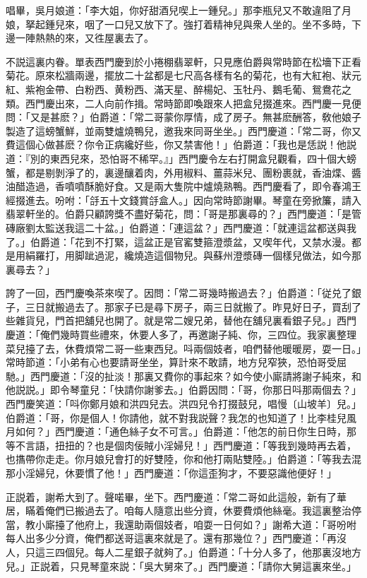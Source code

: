 唱畢，吳月娘道：「李大姐，你好甜酒兒喫上一鍾兒。」那李瓶兒又不敢違阻了月娘，拏起鍾兒來，咽了一口兒又放下了。強打着精神兒與衆人坐的。坐不多時，下邊一陣熱熱的來，又徃屋裏去了。

不説這裏内眷。單表西門慶到於小捲棚翡翠軒，只見應伯爵與常時節在松墻下正看菊花。原來松牆兩邊，擺放二十盆都是七尺高各樣有名的菊花，也有大紅袍、狀元紅、紫袍金帶、白粉西、黄粉西、滿天星、醉楊妃、玉牡丹、鵝毛葡、鴛鴦花之類。西門慶出來，二人向前作揖。常時節即喚跟來人把盒兒掇進來。西門慶一見便問：「又是甚麽？」伯爵道：「常二哥蒙你厚情，成了房子。無甚麽酬答，敎他娘子製造了這螃蟹鮮，並兩雙爐燒鴨兒，邀我來同哥坐坐。」西門慶道：「常二哥，你又費這個心做甚麽？你令正病纔好些，你又禁害他！」伯爵道：「我也是恁説！他説道：『別的東西兒來，恐怕哥不稀罕。』」西門慶令左右打開盒兒觀看，四十個大螃蟹，都是剔剝淨了的，裏邊釀着肉，外用椒料、薑蒜米兒、團粉裹就，香油煠、醬油醋造過，香噴噴酥脆好食。又是兩大隻院中爐燒熟鴨。西門慶看了，即令春鴻王經掇進去。吩咐：「㧱五十文錢賞㧱盒人。」因向常時節謝畢。琴童在旁掀簾，請入翡翠軒坐的。伯爵只顧誇獎不盡好菊花，問：「哥是那裏尋的？」西門慶道：「是管磚廠劉太監送我這二十盆。」伯爵道：「連這盆？」西門慶道：「就連這盆都送與我了。」伯爵道：「花到不打緊，這盆正是官窰雙箍澄漿盆，又喫年代，又禁水漫。都是用絹羅打，用脚跐過泥，纔燒造這個物兒。與蘇州澄漿磚一個樣兒做法，如今那裏尋去？」

誇了一回，西門慶喚茶來喫了。因問：「常二哥幾時搬過去？」伯爵道：「従兑了銀子，三日就搬過去了。那家子已是尋下房子，兩三日就搬了。昨見好日子，買刮了些雜貨兒，門首把舖兒也開了。就是常二嫂兄弟，替他在舖兒裏看銀子兒。」西門慶道：「俺們幾時買些禮來，休要人多了，再邀謝子純、你，三四位。我家裏整理菜兒擡了去，休費煩常二哥一些東西兒。呌兩個妓者，咱們替他暖暖房，耍一日。」常時節道：「小弟有心也要請哥坐坐，算計來不敢請，地方兒窄狹，恐怕哥受屈馳。」西門慶道：「沒的扯淡！那裏又費你的事起來？如今使小廝請將謝子純來，和他説説。」即令琴童兒：「快請你謝爹去。」伯爵因問：「哥，你那日呌那兩個去？」西門慶笑道：「呌你鄭月娘和洪四兒去。洪四兒令打掇鼓兒，唱慢〔山坡羊〕兒。」伯爵道：「哥，你是個人！你請他，就不對我説聲？我怎的也知道了！比李桂兒風月如何？」西門慶道：「通色絲子女不可言。」伯爵道：「他怎的前日你生日時，那等不言語，扭扭的？也是個肉佞賊小淫婦兒！」西門慶道：「等我到幾時再去着，也㩦帶你走走。你月娘兒會打的好雙陸，你和他打兩貼雙陸。」伯爵道：「等我去混那小淫婦兒，休要慣了他！」西門慶道：「你這歪狗才，不要惡識他便好！」

正説着，謝希大到了。聲喏畢，坐下。西門慶道：「常二哥如此這般，新有了華居，瞞着俺們已搬過去了。咱每人隨意出些分資，休要費煩他絲毫。我這裏整治停當，教小廝擡了他府上，我還助兩個妓者，咱耍一日何如？」謝希大道：「哥吩咐每人出多少分資，俺們都送哥這裏來就是了。還有那幾位？」西門慶道：「再沒人，只這三四個兒。每人二星銀子就夠了。」伯爵道：「十分人多了，他那裏沒地方兒。」正説着，只見琴童來説：「吳大舅來了。」西門慶道：「請你大舅這裏來坐。」

